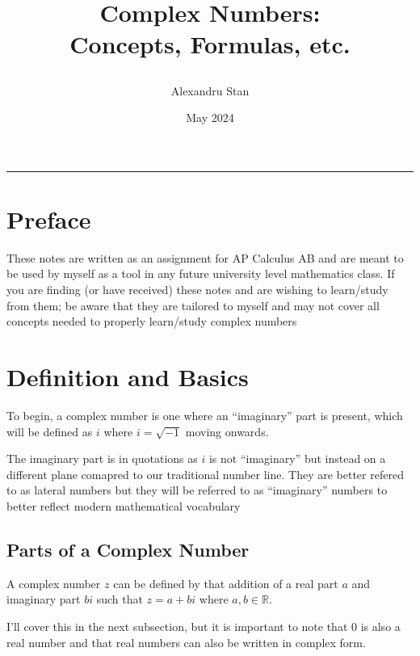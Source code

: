 \documentclass[12pt]{article}
\title{
    \textbf{Complex Numbers:\\ Concepts, Formulas, etc.}
    \author{Alexandru Stan}
    \date{May 2024}
}
\newcommand{\R}{{\mathbb{R}}}
\newcommand{\fline}{\par\noindent\rule{\textwidth}{0.1pt}}
\begin{document}
    \maketitle
    \vfill
    \newpage

    \tableofcontents
    \fline
    \newpage

    \section{Preface}

    These notes are written as an assignment for AP Calculus AB and are meant to be used by myself as a tool 
    in any future university level mathematics class. If you are finding (or have received) these notes 
    and are wishing to learn/study from them; be aware that they are tailored to myself and may not 
    cover all concepts needed to properly learn/study complex numbers

    \section{Definition and Basics}

    To begin, a complex number is one where an ``imaginary'' part is present, 
    which will be defined as $i$ where $i=\sqrt{-1}$ moving onwards. 

    The imaginary part is in quotations as $i$ is not ``imaginary'' but instead
    on a different plane comapred to our traditional number line. They are 
    better refered to as lateral numbers but they will be referred to as 
    ``imaginary'' numbers to better reflect modern mathematical vocabulary

    \subsection{Parts of a Complex Number}




    A complex number $z$ can be defined by that addition of a real part $a$ and imaginary part
    $bi$ such that $z = a + bi$ where $a, b\in\R$. 

    I'll cover this in the next subsection, but it is important to note that $0$ is also 
    a real number and that real numbers can also be written in complex form. 
\end{document}
